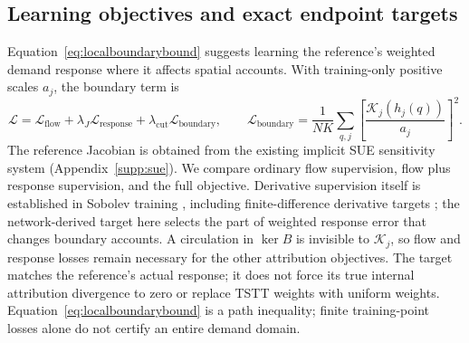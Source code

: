 \subsection{Learning objectives and exact endpoint targets}\label{app:learning-objectives}
Equation~\eqref{eq:localboundarybound} suggests learning the reference's weighted demand response
where it affects spatial accounts. With training-only positive scales
$a_j$, the boundary term is
\begin{equation}
\mathcal L=\mathcal L_{\mathrm{flow}}+\lambda_J\mathcal L_{\mathrm{response}}
+\lambda_{\mathrm{cut}}\mathcal L_{\mathrm{boundary}},\qquad
\mathcal L_{\mathrm{boundary}}
=\frac1{NK}\sum_{q,j}\left[\frac{\mathcal K_j(h_j(q))}{a_j}\right]^2.
\label{eq:trainingobjective}
\end{equation}
The reference Jacobian is obtained from the existing implicit SUE
sensitivity system (Appendix~\ref{supp:sue}). We compare ordinary
flow supervision, flow plus response supervision, and the full objective.
Derivative supervision itself is established in Sobolev training
\citep{czarnecki2017sobolev}, including finite-difference derivative targets
\citep{yuan2022sobolev}; the network-derived target here selects the
part of weighted response error that changes boundary accounts.
A circulation in $\ker B$ is invisible to $\mathcal K_j$, so flow and
response losses remain necessary for the other attribution objectives.
The target matches the reference's actual response; it does not force
its true internal attribution divergence to zero or replace TSTT weights
with uniform weights. Equation~\eqref{eq:localboundarybound} is a path
inequality; finite training-point losses alone do not certify an entire
demand domain.


